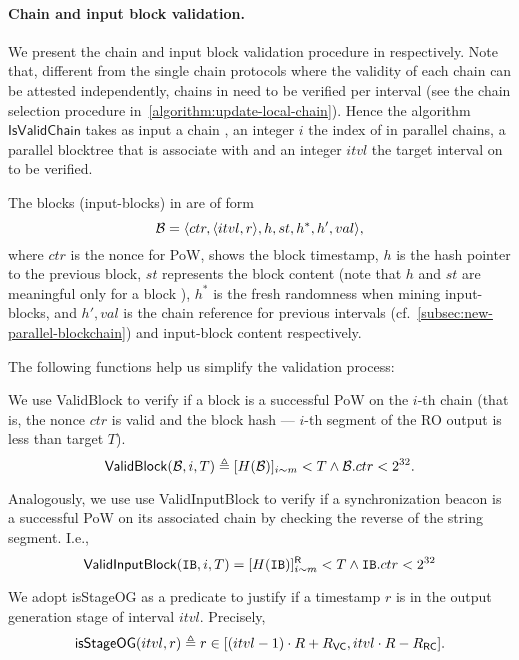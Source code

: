 

\paragraph{Chain and input block validation.}
%
We present the chain and input block validation procedure in \pSMR respectively.
%
Note that, different from the single chain protocols where the validity of each chain can be attested independently, chains in \pSMR need to be verified per interval (see the chain selection procedure in~\cref{algorithm:update-local-chain}).
%
Hence the algorithm $\mathsf{IsValidChain}$ takes as input a chain \chain, an integer $i$ the index of \chain in parallel chains, a parallel blocktree \parallelTrees that \chain is associate with and an integer $itvl$ the target interval on \chain to be verified.

The blocks (input-blocks) in \pSMR are of form
%
\[ \mathcal{B} = \langle ctr, \langle itvl, r \rangle, h, st, h^\ast, h', val \rangle, \]
%
where $ctr$ is the nonce for PoW,  shows the block timestamp, $h$ is the hash pointer to the previous block, $st$ represents the block content (note that $h$ and $st$ are meaningful only for a block \block), $h^\ast$ is the fresh randomness when mining input-blocks, and $h', val$ is the chain reference for previous intervals (cf.~\cref{subsec:new-parallel-blockchain}) and input-block content respectively.

The following functions help us simplify the validation process:
%
\begin{cccItemize}[noitemsep]
    \item We use \textsf{ValidBlock} to verify if a block is a successful PoW on the $i$-th chain (that is, the nonce $ctr$ is valid and the block hash --- $i$-th segment of the RO output is less than target $T$).
    \[ \mathsf{ValidBlock}(\mathcal{B}, i, T) \triangleq [H(\mathcal{B})]_{i\sim m} < T \wedge \mathcal{B}.ctr < 2^{32}. \]

    \item Analogously, we use use \textsf{ValidInputBlock} to verify if a synchronization beacon is a successful PoW on its associated chain by checking the reverse of the string segment.
    I.e.,
    \begin{equation*}
        \mathsf{ValidInputBlock}(\mathtt{IB}, i, T) = [H(\mathtt{IB})]^{\mathsf{R}}_{i\sim m} < T \wedge \mathtt{IB}.ctr < 2^{32}
    \end{equation*}

    \item We adopt \textsf{isStageOG} as a predicate to justify if a timestamp $r$ is in the output generation stage of interval $itvl$.
    Precisely,
    \begin{equation*}
        \mathsf{isStageOG}(itvl, r) \triangleq r \in [(itvl - 1) \cdot R + R_{\mathsf{VC}}, itvl \cdot R - R_{\mathsf{RC}}].
    \end{equation*}
\end{cccItemize}

